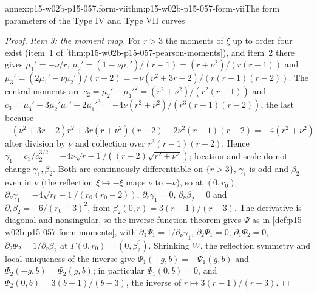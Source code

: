 \begin{annexitem}{annex:p15-w02b-p15-057.form-vii}{thm:p15-w02b-p15-057-form-vii}{The form parameters of the Type IV and Type VII curves}
\begin{proof}
\emph{Item 3: the moment map.} For \(r>3\) the moments of \(\xi\) up to
order four exist (item~1 of \cref{thm:p15-w02b-p15-057-pearson-moments}),
and item~2 there gives \(\mu_1'=-\nu/r\),
\(\mu_2'=(1-\nu\mu_1')/(r-1)=(r+\nu^2)/(r(r-1))\) and
\(\mu_3'=(2\mu_1'-\nu\mu_2')/(r-2)=-\nu(\nu^2+3r-2)/(r(r-1)(r-2))\). The
central moments are \(c_2=\mu_2'-\mu_1'^2=(r^2+\nu^2)/(r^2(r-1))\) and
\(c_3=\mu_3'-3\mu_2'\mu_1'+2\mu_1'^3=-4\nu(r^2+\nu^2)/(r^3(r-1)(r-2))\),
the last because
\(-(\nu^2+3r-2)r^2+3r(r+\nu^2)(r-2)-2\nu^2(r-1)(r-2)=-4(r^2+\nu^2)\)
after division by \(\nu\) and collection over
\(r^3(r-1)(r-2)\). Hence
\(\gamma_1=c_3/c_2^{3/2}=-4\nu\sqrt{r-1}/((r-2)\sqrt{r^2+\nu^2})\); location
and scale do not change \(\gamma_1,\beta_2\). Both are continuously
differentiable on \(\{r>3\}\), \(\gamma_1\) is odd and \(\beta_2\) even in
\(\nu\) (the reflection \(\xi\mapsto-\xi\) maps \(\nu\) to \(-\nu\)), so at
\((0,r_0)\): \(\partial_\nu\gamma_1=-4\sqrt{r_0-1}/(r_0(r_0-2))\),
\(\partial_r\gamma_1=0\), \(\partial_\nu\beta_2=0\) and
\(\partial_r\beta_2=-6/(r_0-3)^2\), from \(\beta_2(0,r)=3(r-1)/(r-3)\). The
derivative is diagonal and nonsingular, so the inverse function theorem
gives \(\Psi\) as in \cref{def:p15-w02b-p15-057-form-moments}, with
\(\partial_1\Psi_1=1/\partial_\nu\gamma_1\), \(\partial_2\Psi_1=0\),
\(\partial_1\Psi_2=0\), \(\partial_2\Psi_2=1/\partial_r\beta_2\) at
\(\Gamma(0,r_0)=(0,\beta_2^0)\). Shrinking \(W\), the reflection symmetry
and local uniqueness of the inverse give \(\Psi_1(-g,b)=-\Psi_1(g,b)\) and
\(\Psi_2(-g,b)=\Psi_2(g,b)\); in particular \(\Psi_1(0,b)=0\), and
\(\Psi_2(0,b)=3(b-1)/(b-3)\), the inverse of \(r\mapsto3(r-1)/(r-3)\).


\end{proof}
\end{annexitem}
